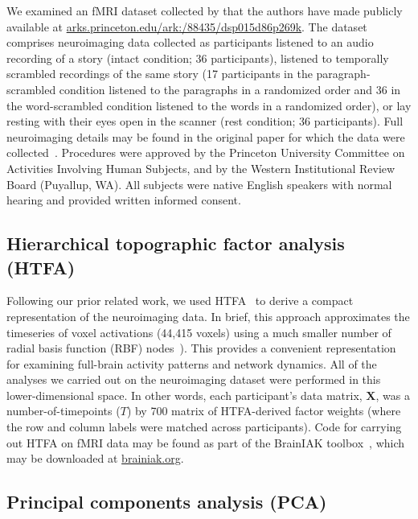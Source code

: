 \documentclass[english, 11pt]{article}
\begin{document}
We examined an fMRI dataset collected by \cite{SimoEtal16} that the authors
have made publicly available at
\href{http://arks.princeton.edu/ark:/88435/dsp015d86p269k}{arks.princeton.edu/ark:/88435/dsp015d86p269k}.
The dataset comprises neuroimaging data collected as participants listened to
an audio recording of a story (intact condition; 36 participants), listened to
temporally scrambled recordings of the same story (17 participants in the
paragraph-scrambled condition listened to the paragraphs in a randomized order
and 36 in the word-scrambled condition listened to the words in a randomized
order), or lay resting with their eyes open in the scanner (rest condition; 36
participants). Full neuroimaging details may be found in the original paper for
which the data were collected~\cite{SimoEtal16}. Procedures were approved by
the Princeton University Committee on Activities Involving Human Subjects, and
by the Western Institutional Review Board (Puyallup, WA). All subjects were
native English speakers with normal hearing and provided written informed
consent.

\subsection*{Hierarchical topographic factor analysis (HTFA)}

Following our prior related work, we used HTFA~\cite{MannEtal18} to derive a
compact representation of the neuroimaging data. In brief, this approach
approximates the timeseries of voxel activations (44,415 voxels) using a much
smaller number of radial basis function (RBF) nodes~\citep[in this case, 700
nodes, as determined by an optimization procedure;][]{MannEtal18}). This
provides a convenient representation for examining full-brain activity patterns
and network dynamics. All of the analyses we carried out on the neuroimaging
dataset were performed in this lower-dimensional space. In other words, each
participant's data matrix, $\mathbf{X}$, was a number-of-timepoints ($T$) by 700
matrix of HTFA-derived factor weights (where the row and column labels were
matched across participants). Code for carrying out HTFA on fMRI data may be
found as part of the BrainIAK toolbox~\cite{CapoEtal17, KumaEtal21}, which may
be downloaded at \href{https://brainiak.org/}{brainiak.org}.

\subsection*{Principal components analysis (PCA)}
\end{document}
